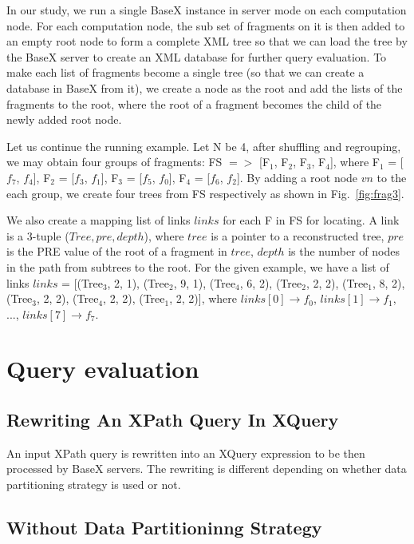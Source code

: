 In our study, we run a single BaseX instance in server mode on each computation
node. For each computation node, the sub set of fragments on it is then added to
an empty root node to form a complete XML tree so that we can load the tree by
the BaseX server to create an XML database for further query evaluation. To make
each list of fragments become a single tree (so that we can create a database in
BaseX from it),  we create a node as the root and add the lists of the fragments
to the root, where the root of a fragment becomes the child of the newly added
root node. 

Let us continue the running example. Let N be 4, after shuffling and regrouping,
we may obtain four groups of fragments: FS $=>$ [F$_1$, F$_2$, F$_3$, F$_4$], where
F$_1$ = [$f_7$, $f_4$],
F$_2$ = [$f_3$, $f_1$],
F$_3$ = [$f_5$, $f_0$],
F$_4$ = [$f_6$, $f_2$].
By adding a root node $vn$ to the each group, we create four trees from FS
respectively as shown in Fig.~\ref{fig:frag3}.

We also create a mapping list of links $links$ for each F in FS for locating.
A link is a 3-tuple ($Tree,
pre, depth$), where $tree$ is a pointer to a reconstructed tree, $pre$ is the PRE
value of the root of a fragment in $tree$, $depth$ is the number of nodes in the
path from subtrees to the root. For the given example, we have a list of links
$links$ =
[(Tree$_3$, 2, 1),
(Tree$_2$, 9, 1),
(Tree$_4$, 6, 2),
(Tree$_2$, 2, 2),
(Tree$_1$, 8, 2),
(Tree$_3$, 2, 2),
(Tree$_4$, 2, 2),
(Tree$_1$, 2, 2)],
where $links[0] \rightarrow f_0$, $links[1] \rightarrow f_1$, ...,  $links[7]
\rightarrow f_7$.

\section{Query evaluation}

\subsection{Rewriting An XPath Query In XQuery}

An input XPath query is rewritten into an XQuery expression to be then processed
by BaseX servers. The rewriting is different depending on whether data
partitioning strategy is used or not.

\subsection{Without Data Partitioninng Strategy}
\label{no-dps}

